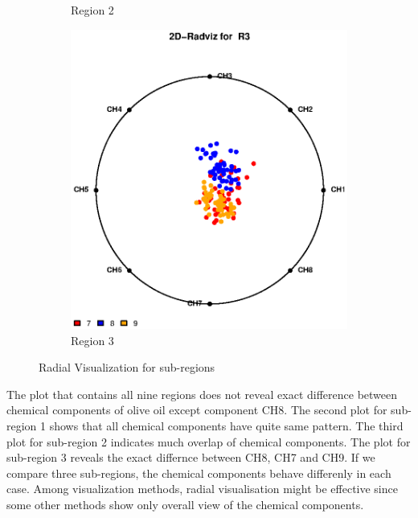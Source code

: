 \documentclass{article}
\begin{document}
\begin{enumerate}[leftmargin = 0 em, label = \arabic*., font = \bfseries]
\begin{enumerate}
\begin{figure}
\begin{subfigure}[b]{.33\textwidth}
            \caption{Region 2}
            \label{R2}
          \end{subfigure}%
           \begin{subfigure}[b]{.33\textwidth}
            \centering
            \includegraphics[width = \textwidth]{R3.eps}
            \caption{Region 3}
            \label{R3}
            \end{subfigure}
          \caption{Radial Visualization for sub-regions}\label{subregions}
\end{figure}

\newpage
The plot that contains all nine regions does not reveal exact difference between chemical components
of olive oil except component CH8. The second plot for sub-region 1 shows that all chemical components have quite same pattern.
The third plot for sub-region 2 indicates much overlap of chemical components. The plot for   sub-region 3 reveals the exact differnce between 
CH8, CH7 and CH9. If we compare three sub-regions, the chemical components behave differenly in each case. Among visualization methods, radial visualisation  might be effective since some other methods show only overall view of the chemical components.



\end{enumerate}
\end{enumerate}
\end{document}
